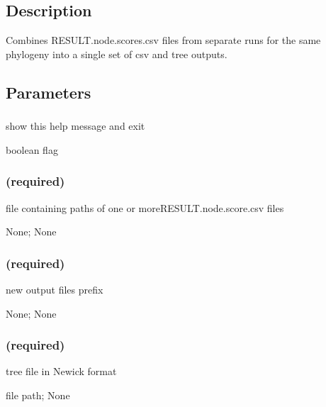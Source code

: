 \documentclass[letterpaper,12pt,english]{sphinxmanual}
\begin{document}
\subsection{Description}
\label{\detokenize{prog_desc:id1}}
Combines RESULT.node.scores.csv files from separate
runs for the same phylogeny into a single set of csv and tree outputs.



\subsection{Parameters}
\label{\detokenize{prog_desc:id2}}

\subsubsection{}
\label{\detokenize{prog_desc:id3}}
 show this help message and exit

 boolean flag


\subsubsection{ (required)}
\label{\detokenize{prog_desc:nodedata-required}}
 file containing paths of one or moreRESULT.node.score.csv files

 None;  None


\subsubsection{ (required)}
\label{\detokenize{prog_desc:out-required}}
 new output files prefix

 None;  None


\subsubsection{ (required)}
\label{\detokenize{prog_desc:id4}}
 tree file in Newick format

 file path;  None
\end{document}
